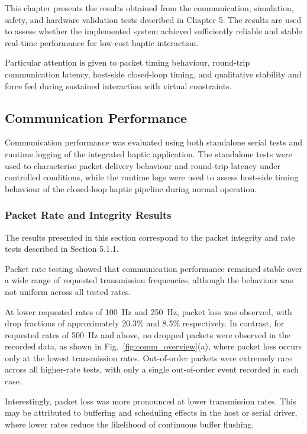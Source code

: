 This chapter presents the results obtained from the communication, simulation, safety, and hardware validation tests described in Chapter 5. The results are used to assess whether the implemented system achieved sufficiently reliable and stable real-time performance for low-cost haptic interaction.

Particular attention is given to packet timing behaviour, round-trip communication latency, host-side closed-loop timing, and qualitative stability and force feel during sustained interaction with virtual constraints.

\subsection{Communication Performance}
Communication performance was evaluated using both standalone serial tests and runtime logging of the integrated haptic application. The standalone tests were used to characterise packet delivery behaviour and round-trip latency under controlled conditions, while the runtime logs were used to assess host-side timing behaviour of the closed-loop haptic pipeline during normal operation.


\subsubsection{Packet Rate and Integrity Results}
The results presented in this section correspond to the packet integrity and rate tests described in Section 5.1.1.

Packet rate testing showed that communication performance remained stable over a wide range of requested transmission frequencies, although the behaviour was not uniform across all tested rates.

At lower requested rates of 100~Hz and 250~Hz, packet loss was observed, with drop fractions of approximately 20.3\% and 8.5\% respectively. In contrast, for requested rates of 500~Hz and above, no dropped packets were observed in the recorded data, as shown in Fig.~\ref{fig:comm_overview}(a), where packet loss occurs only at the lowest transmission rates. Out-of-order packets were extremely rare across all higher-rate tests, with only a single out-of-order event recorded in each case.

Interestingly, packet loss was more pronounced at lower transmission rates. This may be attributed to buffering and scheduling effects in the host or serial driver, where lower rates reduce the likelihood of continuous buffer flushing.

